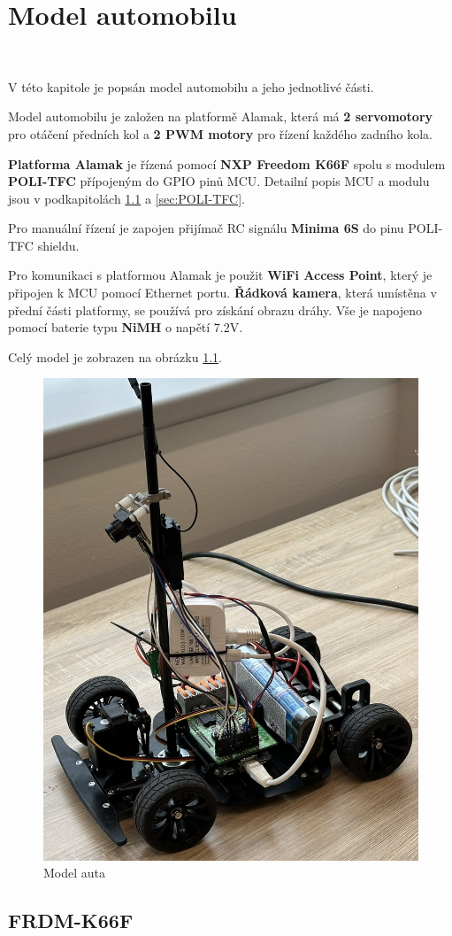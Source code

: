 \chapter{Model automobilu}
\label{sec:CarModel}\
\vspace{-30pt}

V této kapitole je popsán model automobilu a jeho jednotlivé části.

Model automobilu je založen na platformě Alamak, která má
\textbf{2 servomotory} pro otáčení předních kol a
\textbf{2 PWM motory} pro řízení každého
zadního kola.

\textbf{Platforma Alamak} je řízená pomocí \textbf{NXP Freedom K66F}\cite{frdmk66UserGuide} spolu
s modulem \textbf{POLI-TFC} přípojeným do GPIO pinů MCU.
Detailní popis MCU a modulu jsou v podkapitolách \ref{sec:FRDM-K66F}
a \ref{sec:POLI-TFC}.

Pro manuální řízení je zapojen přijímač RC signálu \textbf{Minima 6S} do pinu POLI-TFC shieldu.

Pro komunikaci s platformou Alamak je použit \textbf{WiFi Access Point}, který je připojen k MCU pomocí Ethernet portu. \textbf{Řádková kamera}, která umístěna v přední části platformy,
se používá pro získání obrazu dráhy. Vše je napojeno pomocí baterie typu \textbf{NiMH} o napětí 7.2V.

Celý model je zobrazen na obrázku \ref{fig:car}.
\begin{figure}[!h]
    \vspace{-10pt}
    \centering
    \includegraphics[width = .45\linewidth]{Figures/Car.jpeg}
    \caption{Model auta}
    \label{fig:car}
    \vspace{-10pt}
\end{figure}

\section{FRDM-K66F}
\label{sec:FRDM-K66F}\


